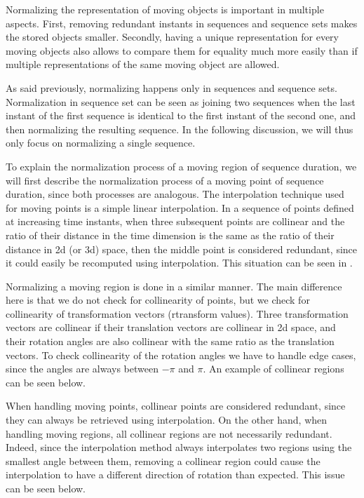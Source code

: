 Normalizing the representation of moving objects is important in multiple aspects. First, removing redundant instants in sequences and sequence sets makes the stored objects smaller. Secondly, having a unique representation for every moving objects also allows to compare them for equality much more easily than if multiple representations of the same moving object are allowed.

As said previously, normalizing happens only in sequences and sequence sets. Normalization in sequence set can be seen as joining two sequences when the last instant of the first sequence is identical to the first instant of the second one, and then normalizing the resulting sequence. In the following discussion, we will thus only focus on normalizing a single sequence.

To explain the normalization process of a moving region of sequence duration, we will first describe the normalization process of a moving point of sequence duration, since both processes are analogous. The interpolation technique used for moving points is a simple linear interpolation. In a sequence of points defined at increasing time instants, when three subsequent points are collinear and the ratio of their distance in the time dimension is the same as the ratio of their distance in 2d (or 3d) space, then the middle point is considered redundant, since it could easily be recomputed using interpolation. This situation can be seen in .

Normalizing a moving region is done in a similar manner. The main difference here is that we do not check for collinearity of points, but we check for collinearity of transformation vectors (rtransform values). Three transformation vectors are collinear if their translation vectors are collinear in 2d space, and their rotation angles are also collinear with the same ratio as the translation vectors. To check collinearity of the rotation angles we have to handle edge cases, since the angles are always between $-\pi$ and $\pi$. An example of collinear regions can be seen below.


When handling moving points, collinear points are considered redundant, since they can always be retrieved using interpolation. On the other hand, when handling moving regions, all collinear regions are not necessarily redundant. Indeed, since the interpolation method always interpolates two regions using the smallest angle between them, removing a collinear region could cause the interpolation to have a different direction of rotation than expected. This issue can be seen below.

